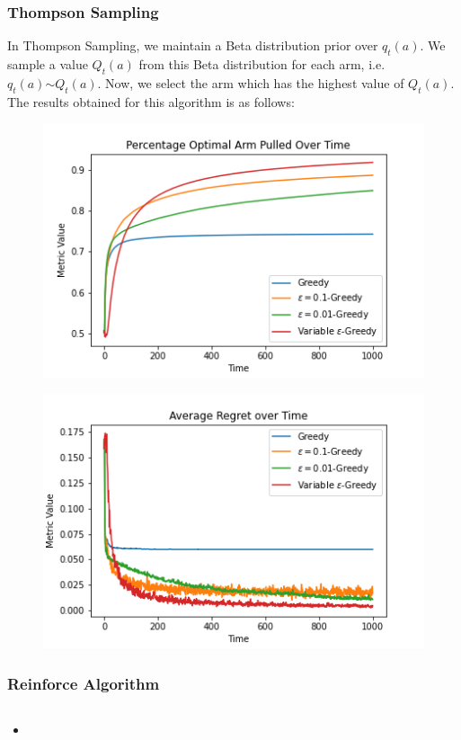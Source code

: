 \documentclass{article}
\begin{document}
		\subsubsection{Thompson Sampling}
		In Thompson Sampling, we maintain a Beta distribution prior over $q_{t}(a)$. We sample a value $Q_{t}(a)$ from this Beta distribution for each arm, i.e.
		$q_{t}(a) \stackrel{}{\sim} Q_{t}(a)$. Now, we select the arm which has the highest value of $Q_{t}(a)$. The results obtained for this algorithm is as 
		follows:
		
		\begin{figure}[H]
		\graphicspath{ {../Experiments/Bernoulli_2_Thompson_Sampling/} }
		\centering
		\begin{minipage}{.5\textwidth}
		  \centering
		  \includegraphics[width=\linewidth]{Percentage_Optimal_Arm_Pulled_Over_Time.png}
		  \label{fig:test1}
		\end{minipage}%
		\begin{minipage}{.5\textwidth}
		  \centering
		  \includegraphics[width=\linewidth]{Average_Regret_over_Time.png}
		  \label{fig:test2}
		\end{minipage}
		\end{figure}
		
		\subsubsection{Reinforce Algorithm}
		
		\begin{equation}
		\nonumber
		\end{equation}
		
		\begin{itemize}
			\item
		\end{itemize}
\end{document}
